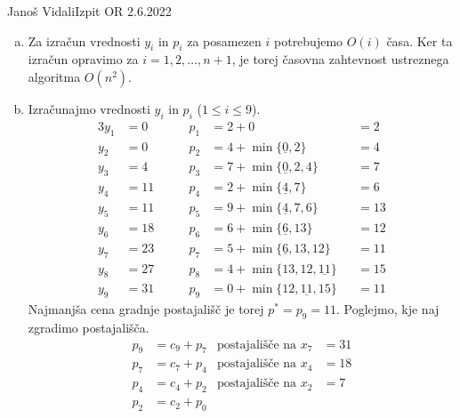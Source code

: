 \begin{naloga}{Janoš Vidali}{Izpit OR 2.6.2022}
\begin{odgovor}
\begin{enumerate}[(a)]
\item Za izračun vrednosti $y_i$ in $p_i$ za posamezen $i$
potrebujemo $O(i)$ časa.
Ker ta izračun opravimo za $i = 1, 2, \dots, n+1$,
je torej časovna zahtevnost ustreznega algoritma $O(n^2)$.

\item Izračunajmo vrednosti $y_i$ in $p_i$ ($1 \le i \le 9$).
\begin{alignat*}{3}
y_1 &=  0 &\qquad p_1 &= 2 + 0                              &&=  2 \\
y_2 &=  0 &\qquad p_2 &= 4 + \min\{\underline{0}, 2\}       &&=  4 \\
y_3 &=  4 &\qquad p_3 &= 7 + \min\{\underline{0}, 2, 4\}    &&=  7 \\
y_4 &= 11 &\qquad p_4 &= 2 + \min\{\underline{4}, 7\}       &&=  6 \\
y_5 &= 11 &\qquad p_5 &= 9 + \min\{\underline{4}, 7, 6\}    &&= 13 \\
y_6 &= 18 &\qquad p_6 &= 6 + \min\{\underline{6}, 13\}      &&= 12 \\
y_7 &= 23 &\qquad p_7 &= 5 + \min\{\underline{6}, 13, 12\}  &&= 11 \\
y_8 &= 27 &\qquad p_8 &= 4 + \min\{13, 12, \underline{11}\} &&= 15 \\
y_9 &= 31 &\qquad p_9 &= 0 + \min\{12, \underline{11}, 15\} &&= 11
\end{alignat*}
Najmanjša cena gradnje postajališč je torej $p^* = p_9 = 11$.
Poglejmo, kje naj zgradimo postajališča.
\begin{align*}
p_9 &= c_9 + p_7 & \text{postajališče na } x_7 &= 31 \\
p_7 &= c_7 + p_4 & \text{postajališče na } x_4 &= 18 \\
p_4 &= c_4 + p_2 & \text{postajališče na } x_2 &= 7 \\
p_2 &= c_2 + p_0
\end{align*}
\end{enumerate}
\end{odgovor}
\end{naloga}
